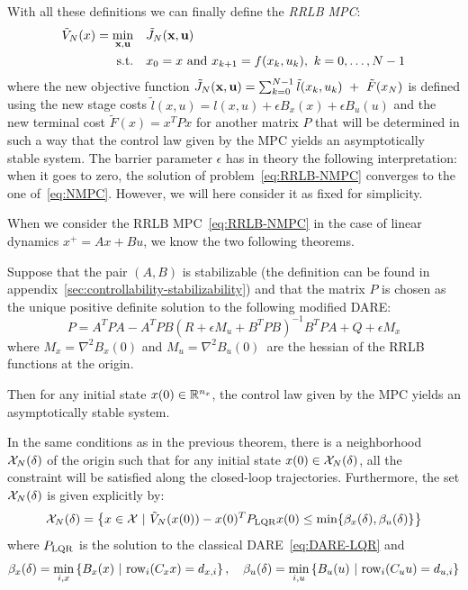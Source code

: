 \documentclass[12pt]{article}
\begin{document}
\vspace{24pt}

\noindent With all these definitions we can finally define the \textit{RRLB MPC}:
\begin{align}
	\begin{split}\label{eq:RRLB-NMPC}
		\tilde{V}_N(x)=\underset{\bf{x},\bf{u}}{\min} &\quad \tilde{J}_N(\bf{x},\bf{u})\\
		\text{s.t.} &\quad x_0=x\text{ and }x_{k+1}=f(x_k,u_k),~k=0,\ldots,N-1\\
	\end{split}
\end{align}
where the new objective function $\tilde{J}_N(\bf{x},\bf{u})=\sum_{k=0}^{N-1}\tilde{l}(x_k,u_k)~+~\tilde{F}(x_N)$ is defined using the new stage costs $\tilde{l}(x,u)=l(x,u)+\epsilon B_x(x)+\epsilon B_u(u)$ and the new terminal cost $\tilde{F}(x)=x^TPx$ for another matrix $P$ that will be determined in such a way that the control law given by the MPC yields an asymptotically stable system.
The barrier parameter $\epsilon$ has in theory the following interpretation: when it goes to zero, the solution of problem~\ref{eq:RRLB-NMPC} converges to the one of~\ref{eq:NMPC}.
However, we will here consider it as fixed for simplicity.

\vspace{12pt}

\noindent When we consider the RRLB MPC~\ref{eq:RRLB-NMPC} in the case of linear dynamics $x^+=Ax+Bu$, we know the two following theorems.

\begin{theorem}
	\label{nominal-stability-linear-case}
	Suppose that the pair $(A,B)$ is stabilizable (the definition can be found in appendix~\ref{sec:controllability-stabilizability})
	and that the matrix $P$ is chosen as the unique positive definite solution to the following modified DARE:
	$$P=A^TPA-A^TPB(R+\epsilon M_u+B^TPB)^{-1}B^TPA+Q+\epsilon M_x$$
	where $M_x=\nabla^2 B_x(0)$ and $M_u=\nabla^2 B_u(0)$\, are the hessian of the RRLB functions at the origin.

	Then for any initial state $x(0)\in\R^{n_x}$, the control law given by the MPC yields an asymptotically stable system.
\end{theorem}

\begin{theorem}
	\label{constraint-satisfaction-guarantee-linear-case}
	In the same conditions as in the previous theorem, there is a neighborhood $\cal{X}_N(\delta)$ of the origin such that for any initial state $x(0)\in\cal{X}_N(\delta)$, all the constraint will be satisfied along the closed-loop trajectories.
	Furthermore, the set $\cal{X}_N(\delta)$ is given explicitly by:
	$$\cal{X}_N(\delta)=\left\{x\in\cal{X}~|~\tilde{V}_N(x(0))-x(0)^TP_{\rm{LQR}}x(0)\leq\min\{\beta_x(\delta),\beta_u(\delta)\}\right\}$$
	where $P_{\rm{LQR}}$ is the solution to the classical DARE~\ref{eq:DARE-LQR} and
	$$\beta_x(\delta)=\underset{i,x}{\min}\left\{ B_x(x)~|~\rm{row}_i(C_xx)=d_{x,i} \right\},\quad \beta_u(\delta)=\underset{i,u}{\min}\left\{ B_u(u)~|~\rm{row}_i(C_uu)=d_{u,i} \right\}$$
\end{theorem}
\end{document}
